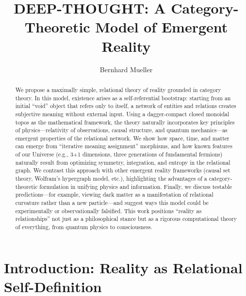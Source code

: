 \documentclass{article}
\title{DEEP-THOUGHT: A Category-Theoretic Model of Emergent Reality}
\author{Bernhard Mueller}
\begin{document}
\maketitle

\begin{abstract}
We propose a maximally simple, relational theory of reality grounded in category theory. In this model, existence arises as a self-referential bootstrap: starting from an initial ``void'' object that refers only to itself, a network of entities and relations creates subjective meaning without external input. Using a dagger-compact closed monoidal topos as the mathematical framework, the theory naturally incorporates key principles of physics---relativity of observations, causal structure, and quantum mechanics---as emergent properties of the relational network. We show how space, time, and matter can emerge from ``iterative meaning assignment'' morphisms, and how known features of our Universe (e.g., 3+1 dimensions, three generations of fundamental fermions) naturally result from optimizing symmetry, integration, and entropy in the relational graph. We contrast this approach with other emergent reality frameworks (causal set theory, Wolfram's hypergraph model, etc.), highlighting the advantages of a category-theoretic formulation in unifying physics and information. Finally, we
 discuss testable predictions---for example, viewing dark matter as a manifestation of relational curvature rather than a new particle---and suggest ways this model could be experimentally or observationally falsified. This work positions ``reality as relationships'' not just as a philosophical stance but as a rigorous computational theory of everything, from quantum physics to consciousness.

\end{abstract}

\section{Introduction: Reality as Relational Self-Definition}
\end{document}
